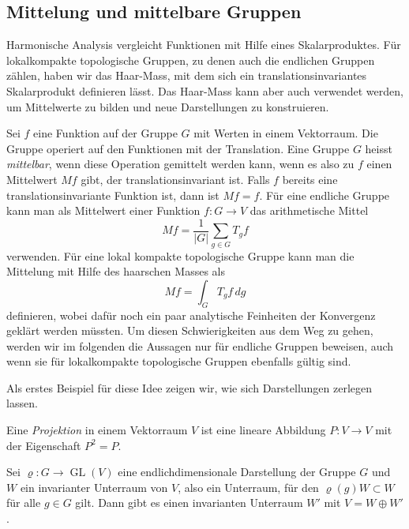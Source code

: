 %
%
%

%
%
\subsection{Mittelung und mittelbare Gruppen}
Harmonische Analysis vergleicht Funktionen mit Hilfe eines Skalarproduktes.
Für lokalkompakte topologische Gruppen, zu denen auch die endlichen Gruppen
zählen, haben wir das Haar-Mass, mit dem sich ein translationsinvariantes
Skalarprodukt definieren lässt.
Das Haar-Mass kann aber auch verwendet werden, um Mittelwerte zu bilden
und neue Darstellungen zu konstruieren.

Sei $f$ eine Funktion auf der Gruppe $G$ mit Werten in einem Vektorraum.
Die Gruppe operiert auf den Funktionen mit der Translation.
Eine Gruppe $G$ heisst {\em mittelbar}, wenn diese Operation gemittelt
werden kann, wenn es also zu $f$ einen Mittelwert $Mf$ gibt, der 
translationsinvariant ist.
Falls $f$ bereits eine translationsinvariante Funktion ist, dann 
ist $Mf=f$.
Für eine endliche Gruppe kann man als Mittelwert einer Funktion
$f\colon G\to V$ das arithmetische Mittel
\[
Mf
=
\frac{1}{|G|}
\sum_{g\in G} T_gf
\]
verwenden.
Für eine lokal kompakte topologische Gruppe kann man die Mittelung
mit Hilfe des haarschen Masses als
\[
Mf
=
\int_G T_gf\,dg
\]
definieren, wobei dafür noch ein paar analytische Feinheiten der
Konvergenz geklärt werden müssten.
Um diesen Schwierigkeiten aus dem Weg zu gehen, werden wir im folgenden
die Aussagen nur für endliche Gruppen beweisen, auch wenn sie für
lokalkompakte topologische Gruppen ebenfalls gültig sind.

Als erstes Beispiel für diese Idee zeigen wir, wie sich Darstellungen 
zerlegen lassen.

\begin{definition}
\label{buch:gruppen:darstellungen:def:projektion}
Eine {\em Projektion} in einem Vektorraum $V$ ist eine lineare Abbildung
$P\colon V\to V$ mit der Eigenschaft $P^2=P$.
\end{definition}

\begin{satz}
\label{buch:gruppen:darstellungen:satz:projektion}
Sei $\varrho\colon G\to\operatorname{GL}(V)$  eine endlichdimensionale
Darstellung der Gruppe $G$ und $W$ ein invarianter Unterraum von $V$,
also ein Unterraum, für den $\varrho(g)W\subset W$ für alle $g\in G$ gilt.
Dann gibt es einen invarianten Unterraum $W'$ mit $V=W\oplus W'$.
\end{satz}

